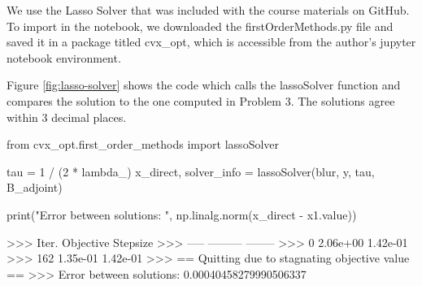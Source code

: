 \documentclass{homework}
\begin{document}
We use the Lasso Solver that was included with the course materials on GitHub.
To import in the notebook, we downloaded the firstOrderMethods.py file and saved it
in a package titled cvx\_opt, which is accessible from the author's jupyter notebook environment.

Figure \ref{fig:lasso-solver} shows the code which calls the lassoSolver function and compares
the solution to the one computed in Problem 3. The solutions agree within 3 decimal places.


\begin{center}
    \begin{python}
from cvx_opt.first_order_methods import lassoSolver

tau = 1 / (2 * lambda_)
x_direct, solver_info = lassoSolver(blur, y, tau, B_adjoint)

print("Error between solutions: ", np.linalg.norm(x_direct - x1.value))


>>> Iter.  Objective Stepsize
>>> -----  --------- --------
>>>     0  2.06e+00  1.42e-01
>>>   162  1.35e-01  1.42e-01
>>> ==  Quitting due to stagnating objective value  ==
>>> Error between solutions: 0.00040458279990506337
    \end{python}
\label{fig:lasso-solver}
\end{center}
\end{document}
